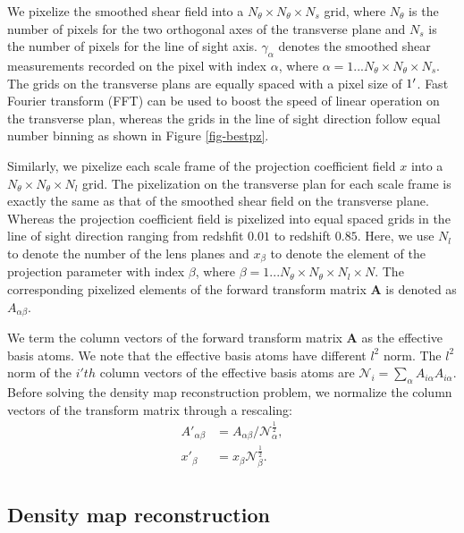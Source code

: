 \documentclass[twocolumn]{aastex62}
\begin{document}
We pixelize the smoothed shear field into a $N_\theta \times N_\theta \times N_s$ grid, where $N_\theta$
is the number of pixels for the two orthogonal axes of the transverse plane and $N_s$ is the number of pixels for the
line of sight axis. $\gamma_{\alpha}$ denotes the smoothed shear measurements recorded on the pixel with index $\alpha$, 
where $\alpha=1...N_\theta \times N_\theta \times N_s$. The grids on the transverse plans are equally spaced with a pixel
size of $1\mbox{$^\prime$}$.
Fast Fourier transform (FFT) can be used to boost the speed of linear operation on the transverse plan, whereas the grids 
in the line of sight direction follow equal number binning as shown in Figure \ref{fig-bestpz}.

Similarly, we pixelize each scale frame of the projection coefficient field $x$ into a $N_\theta \times N_\theta \times N_l$ 
grid. The pixelization on the transverse plan for each scale frame is exactly the same as that of the smoothed shear field 
on the transverse plane. Whereas the projection coefficient field is pixelized into equal spaced grids in the line of sight 
direction ranging from redshfit $0.01$ to redshift $0.85$. Here, we use $N_l$ to denote the number of the lens planes and 
$x_{\beta}$ to denote the element of the projection parameter with index $\beta$, where 
$\beta=1...N_\theta \times N_\theta \times N_l \times N$. The corresponding pixelized elements of the forward transform 
matrix $\mathbf{A}$ is denoted as $A_{\alpha\beta}$.

We term the column vectors of the forward transform matrix $\mathbf{A}$ as the effective basis atoms. We note that the
effective basis atoms have different $l^2$ norm. The $l^2$ norm of the $i'th$ column vectors of the effective basis atoms are
$\mathcal{N}_{i}=\sum_\alpha A_{i\alpha}A_{i\alpha}$. Before solving the density map reconstruction problem, we normalize
the column
vectors of the transform matrix through a rescaling:
\begin{equation}
\begin{split}
A'_{\alpha\beta}&=A_{\alpha\beta}/\mathcal{N}_{\alpha}^{\frac{1}{2}},\\
x'_{\beta}&=x_{\beta}\mathcal{N}_{\beta}^{\frac{1}{2}}.\\
\end{split}
\end{equation}

\subsection{Density map reconstruction}
\label{subsec:method-reconstruction}
\end{document}
